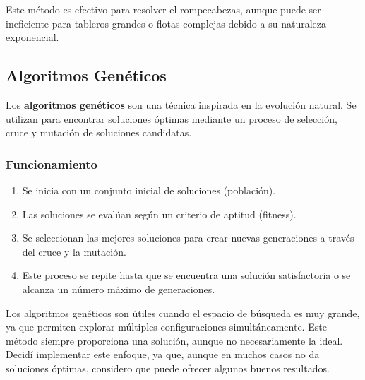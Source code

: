 \documentclass{article}
\begin{document}
Este método es efectivo para resolver el rompecabezas, aunque puede ser ineficiente para tableros grandes o flotas complejas debido a su naturaleza exponencial.

\subsection{Algoritmos Genéticos}

Los \textbf{algoritmos genéticos} son una técnica inspirada en la evolución natural. Se utilizan para encontrar soluciones óptimas mediante un proceso de selección, cruce y mutación de soluciones candidatas.

\subsubsection{Funcionamiento}
\begin{enumerate}
    \item Se inicia con un conjunto inicial de soluciones (población).
    \item Las soluciones se evalúan según un criterio de aptitud (fitness).
    \item Se seleccionan las mejores soluciones para crear nuevas generaciones a través del cruce y la mutación.
    \item Este proceso se repite hasta que se encuentra una solución satisfactoria o se alcanza un número máximo de generaciones.
\end{enumerate}

Los algoritmos genéticos son útiles cuando el espacio de búsqueda es muy grande, ya que permiten explorar múltiples configuraciones simultáneamente. Este método siempre proporciona una solución, aunque no necesariamente la ideal. Decidí implementar este enfoque, ya que, aunque en muchos casos no da soluciones óptimas, considero que puede ofrecer algunos buenos resultados.
\end{document}
